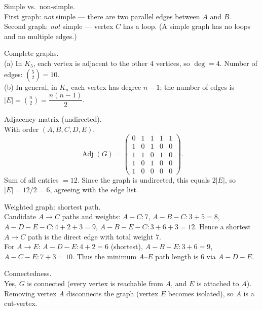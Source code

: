 \documentclass[11pt]{article}
\def\textbf#1{#1}%
\begin{document}
\begin{solution}
\textbf{Simple vs.\ non-simple.}\\
First graph: \emph{not} simple — there are two parallel edges between \(A\) and \(B\).\\
Second graph: \emph{not} simple — vertex \(C\) has a loop.  
(A simple graph has no loops and no multiple edges.)
\end{solution}

\begin{solution}
\textbf{Complete graphs.}\\
(a) In \(K_5\), each vertex is adjacent to the other \(4\) vertices, so \(\deg=4\).  
Number of edges: \(\binom{5}{2}=10\).\\
(b) In general, in \(K_n\) each vertex has degree \(n-1\); the number of edges is
\(|E|=\binom{n}{2}=\dfrac{n(n-1)}{2}\).
\end{solution}

\begin{solution}
\textbf{Adjacency matrix (undirected).}\\
With order \((A,B,C,D,E)\),
\[
\operatorname{Adj}(G)=
\begin{pmatrix}
0&1&1&1&1\\
1&0&1&0&0\\
1&1&0&1&0\\
1&0&1&0&0\\
1&0&0&0&0
\end{pmatrix}.
\]
Sum of all entries \(=12\). Since the graph is undirected, this equals \(2|E|\), so
\(|E|=12/2=6\), agreeing with the edge list.
\end{solution}

\begin{solution}
\textbf{Weighted graph: shortest path.}\\
Candidate \(A\to C\) paths and weights:  
\(A\!-\!C:7\), \(A\!-\!B\!-\!C:3+5=8\), \(A\!-\!D\!-\!E\!-\!C:4+2+3=9\),
\(A\!-\!B\!-\!E\!-\!C:3+6+3=12\).
Hence a shortest \(A\to C\) path is the direct edge with total weight \(\boxed{7}\).\\
For \(A\to E\): \(A\!-\!D\!-\!E:4+2=6\) (shortest),  
\(A\!-\!B\!-\!E:3+6=9\), \(A\!-\!C\!-\!E:7+3=10\).  
Thus the minimum \(A\)–\(E\) path length is \(\boxed{6}\) via \(A\!-\!D\!-\!E\).
\end{solution}

\begin{solution}
\textbf{Connectedness.}\\
Yes, \(G\) is connected (every vertex is reachable from \(A\), and \(E\) is attached to \(A\)).  
Removing vertex \(A\) disconnects the graph (vertex \(E\) becomes isolated), so \(A\) is a cut-vertex.
\end{solution}
\end{document}
